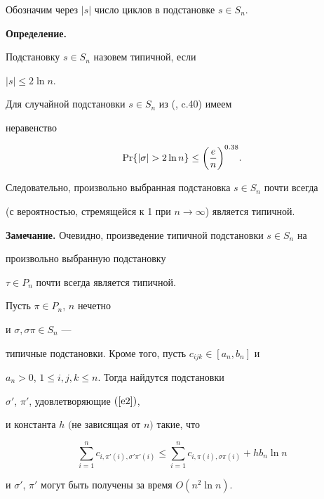 Обозначим через $|s|$ число циклов в подстановке $s\in S_n$.


\medskip





{\bf Определение.}


Подстановку $s\in S_n$ назовем типичной, если 


$|s| \le 2 \ln n$.


\medskip





Для случайной подстановки $s\in S_n$ из (\cite{GGS94}, c.40) имеем 


неравенство


$$


\PR\{|\sigma|> 2 \ln n\} \le \bigg(\frac{e}{n}\bigg)^{0.38}. 


$$ 


Следовательно, произвольно выбранная подстановка $ s \in S_n $ почти всегда 


(с вероятностью, стремящейся к 1 при $n \to \infty$) является типичной. 


\medskip





{\bf Замечание.} Очевидно, произведение типичной подстановки $s \in S_n$ на


произвольно выбранную подстановку


$\tau \in P_n$ почти всегда является типичной.





\begin{thm}


\label{th2}


Пусть $\pi \in P_n$, $n$ нечетно 


и $\sigma, \sigma \pi \in S_n$ ---


типичные подстановки. Кроме того, пусть $c_{ijk} \in [a_n, b_n]$ и


$a_n> 0$, $1 \le i, j, k \le n$. Тогда найдутся подстановки


$\sigma'$, $\pi'$, удовлетворяющие $(\ref{e2})$,


и константа $h$ $($не зависящая от $n)$ такие, что


\begin{equation}


\label{e7}


\sum_{i=1}^{n} c_{i,\pi'(i), \sigma' \pi' (i)}


\le \sum_{i=1}^{n} c_{i,\pi(i), \sigma \pi (i)}


+ h b_n \ln n


\end{equation}


и $\sigma'$, $\pi'$ могут быть получены за время $O(n^2 \ln n)$.


\end{thm}





